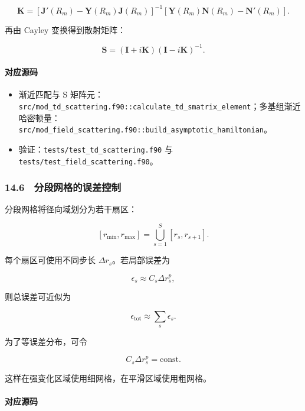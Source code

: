 \documentclass[
]{ctexbook}
\providecommand{\tightlist}{%
  \setlength{\itemsep}{0pt}\setlength{\parskip}{0pt}}
\begin{document}
\[
\mathbf K
=
\left[
\mathbf J'(R_m)-\mathbf Y(R_m)\mathbf J(R_m)
\right]^{-1}
\left[
\mathbf Y(R_m)\mathbf N(R_m)-\mathbf N'(R_m)
\right].
\]

再由 Cayley 变换得到散射矩阵：

\[
\mathbf S
=
(\mathbf I+i\mathbf K)(\mathbf I-i\mathbf K)^{-1}.
\]

\hypertarget{ux5bf9ux5e94ux6e90ux7801-61}{%
\paragraph{对应源码}\label{ux5bf9ux5e94ux6e90ux7801-61}}

\begin{itemize}
\tightlist
\item
  渐近匹配与 S
  矩阵元：\texttt{src/mod\_td\_scattering.f90::calculate\_td\_smatrix\_element}；多基组渐近哈密顿量：\texttt{src/mod\_field\_scattering.f90::build\_asymptotic\_hamiltonian}。
\item
  验证：\texttt{tests/test\_td\_scattering.f90} 与
  \texttt{tests/test\_field\_scattering.f90}。
\end{itemize}

\hypertarget{ux5206ux6bb5ux7f51ux683cux7684ux8befux5deeux63a7ux5236}{%
\subsubsection{14.6　分段网格的误差控制}\label{ux5206ux6bb5ux7f51ux683cux7684ux8befux5deeux63a7ux5236}}

分段网格将径向域划分为若干扇区：

\[
[r_{\min},r_{\max}]
=
\bigcup_{s=1}^{S}[r_s,r_{s+1}].
\]

每个扇区可使用不同步长 \(\Delta r_s\)。若局部误差为

\[
\epsilon_s
\approx
C_s\Delta r_s^{p},
\]

则总误差可近似为

\[
\epsilon_{\mathrm{tot}}
\approx
\sum_s\epsilon_s.
\]

为了等误差分布，可令

\[
C_s\Delta r_s^p
=
\mathrm{const}.
\]

这样在强变化区域使用细网格，在平滑区域使用粗网格。

\hypertarget{ux5bf9ux5e94ux6e90ux7801-62}{%
\paragraph{对应源码}\label{ux5bf9ux5e94ux6e90ux7801-62}}
\end{document}
